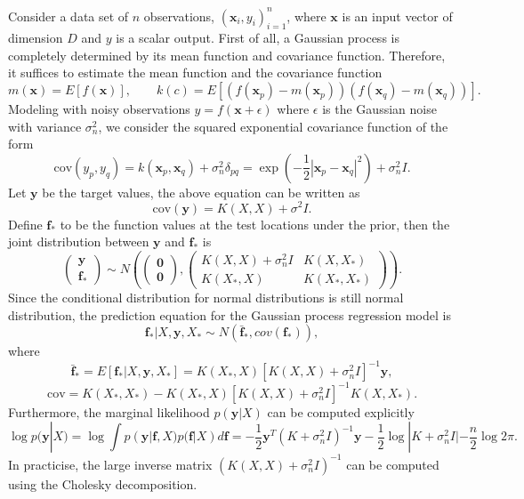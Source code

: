 \documentclass[12pt]{article}
\begin{document}
Consider a data set of $n$ observations, $(\mathbf{x}_i, y_i)_{i=1}^{n}$, where $\mathbf{x}$ is an input vector of dimension $D$ and $y$ is a scalar output. First of all, a Gaussian process is completely determined by its mean function and covariance function. Therefore, it suffices to estimate the mean function and the covariance function
\[
m(\mathbf{x})=E[f(\mathbf{x})], \qquad k(c)=E\left[(f(\mathbf{x}_p)-m(\mathbf{x}_p))(f(\mathbf{x}_q)-m(\mathbf{x}_q))\right].
\]
Modeling with noisy observations $y=f(\mathbf{x}+\epsilon)$ where $\epsilon$ is the Gaussian noise with variance $\sigma_n^2$, we consider the squared exponential covariance function of the form
\[
\text{cov}(y_p,y_q)=k(\mathbf{x}_p,\mathbf{x}_q)+\sigma_n^2\delta_{pq} = \exp\left(-\frac{1}{2}\left|\mathbf{x}_p-\mathbf{x}_q\right|^2\right)+\sigma_n^2I.
\]
Let $\mathbf{y}$ be the target values, the above equation can be written as
\[
\text{cov}(\mathbf{y})=K(X,X)+\sigma^2 I.
\]
Define $\mathbf{f}_*$ to be the function values at the test locations under the prior, then the joint distribution between $\mathbf{y}$ and $\mathbf{f}_*$ is
\[
\begin{pmatrix}
\mathbf{y} \\
\mathbf{f}_*
\end{pmatrix}\sim N\left(\begin{pmatrix}
\mathbf{0} \\
\mathbf{0}
\end{pmatrix},\begin{pmatrix}
K(X,X)+\sigma_n^2I &K(X,X_*)\\
K(X_*,X) & K(X_*,X_*)
\end{pmatrix}\right).
\]
Since the conditional distribution for normal distributions is still normal distribution, the prediction equation for the Gaussian process regression model is
\[
\mathbf{f}_*|X,\mathbf{y}, X_*\sim N(\bar{\mathbf{f}}_*, cov(\mathbf{f}_*)),
\]
where 
\[
\bar{\mathbf{f}}_*=E[\mathbf{f}_*|X,\mathbf{y},X_*]=K(X_*,X)[K(X,X)+\sigma_n^2I]^{-1}\mathbf{y},
\]
\[
\text{cov}=K(X_*,X_*)-K(X_*,X)\left[K(X,X)+\sigma_n^2I\right]^{-1}K(X,X_*).
\]
Furthermore, the marginal likelihood $p(\mathbf{y}|X)$ can be computed explicitly
\[
\log p(\mathbf{y}|X)=\log \int p(\mathbf{y}|\mathbf{f},X)p(\mathbf{f}|X)d\mathbf{f}=-\frac{1}{2}\mathbf{y}^T(K+\sigma_n^2I)^{-1}\mathbf{y}-\frac{1}{2}\log|K+\sigma_n^2I|-\frac{n}{2}\log 2\pi.
\]
In practicise, the large inverse matrix $(K(X,X)+\sigma_n^2I)^{-1}$ can be computed using the Cholesky decomposition.
\end{document}

